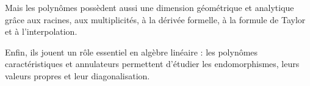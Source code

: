 \documentclass[11pt,a4paper]{article}
\begin{document}
Mais les polynômes possèdent aussi une dimension géométrique et analytique grâce aux racines, aux multiplicités, à la dérivée formelle, à la formule de Taylor et à l'interpolation.

Enfin, ils jouent un rôle essentiel en algèbre linéaire : les polynômes caractéristiques et annulateurs permettent d'étudier les endomorphismes, leurs valeurs propres et leur diagonalisation.
\end{document}
